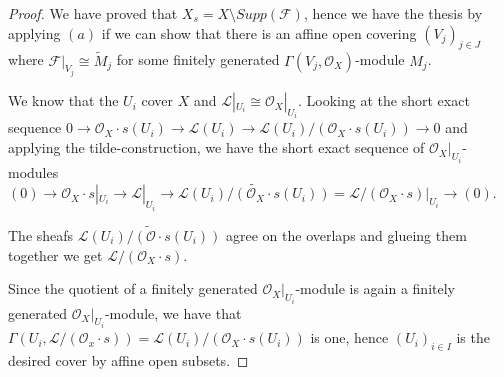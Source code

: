 \documentclass{article}
\newcommand{\exercise}[1]{\noindent {\bf Exercise #1}}
\begin{document}
\begin{proof}
    We have proved that $X_s=X\setminus Supp(\mathcal{F})$, hence we have the
    thesis by applying $(a)$ if we can show that there is an affine open
    covering $(V_j)_{j\in J}$ where $\mathcal{F}|_{V_j}\cong\tilde{M}_j$ for
    some finitely generated $\Gamma(V_j,\mathcal{O}_X)$-module $M_j$.

    We know that the $U_i$ cover $X$ and
    $\mathcal{L}|_{U_i}\cong\mathcal{O}_X|_{U_i}$.
    Looking at the short exact sequence $0\rightarrow\mathcal{O}_X\cdot
    s(U_i)\rightarrow\mathcal{L}(U_i)\rightarrow
    \mathcal{L}(U_i)/(\mathcal{O}_X\cdot s(U_i))\rightarrow 0$ and applying the
    tilde-construction, we have the short exact sequence of
    $\mathcal{O}_X|_{U_i}$-modules $(0)\rightarrow\mathcal{O}_X\cdot s|_{U_i}
    \rightarrow\mathcal{L}|_{U_i}\rightarrow
    \widetilde{\mathcal{L}(U_i)/(\mathcal{O}_X\cdot
    s(U_i))}=\mathcal{L}/(\mathcal{O}_X\cdot s)|_{U_i}\rightarrow (0)$.
    
    The sheafs $\widetilde{\mathcal{L}(U_i)/(\mathcal{O}\cdot s(U_i))}$ agree on
    the overlaps and glueing them together we get
    $\mathcal{L}/(\mathcal{O}_X\cdot s)$.

    Since the quotient of a finitely generated $\mathcal{O}_X|_{U_i}$-module is
    again a finitely generated $\mathcal{O}_X|_{U_i}$-module, we have that
    $\Gamma(U_i,\mathcal{L}/(\mathcal{O}_x\cdot
    s))=\mathcal{L}(U_i)/(\mathcal{O}_X\cdot s(U_i))$ is one, hence $(U_i)_{i\in
    I}$ is the desired cover by affine open subsets.
\end{proof}


~\\
\exercise{2}
\end{document}
